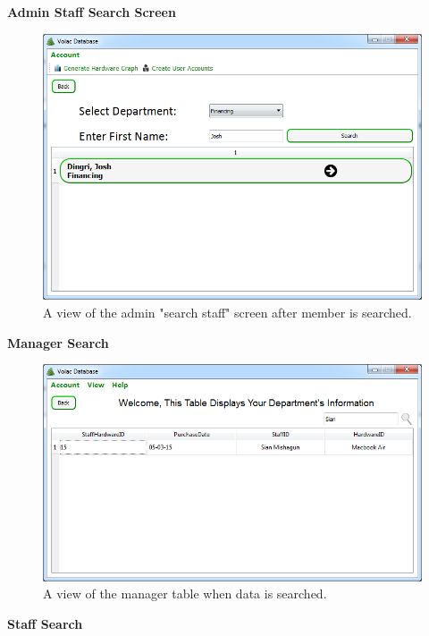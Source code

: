 \textbf{Admin Staff Search Screen}

\begin{figure}[H]
    \includegraphics[width=\textwidth]{./Evaluation/Images/afteradv.png}
    \caption{A view of the admin "search staff" screen after member is searched.} \label{advsearch}
\end{figure}

\textbf{Manager Search}

\begin{figure}[H]
    \includegraphics[width=\textwidth]{./Evaluation/Images/managersearch.png}
    \caption{A view of the manager table when data is searched.} 
\end{figure}

\textbf{Staff Search}

